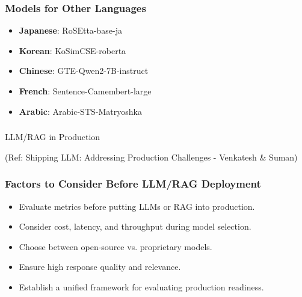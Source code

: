 \begin{frame}[fragile]\frametitle{Models for Other Languages}
    \begin{itemize}
        \item \textbf{Japanese}: RoSEtta-base-ja
        \item \textbf{Korean}: KoSimCSE-roberta
        \item \textbf{Chinese}: GTE-Qwen2-7B-instruct
        \item \textbf{French}: Sentence-Camembert-large
        \item \textbf{Arabic}: Arabic-STS-Matryoshka
    \end{itemize}
\end{frame}

\begin{frame}[fragile]\frametitle{}
\begin{center}
{\Large LLM/RAG in Production}

{\tiny (Ref:  Shipping LLM: Addressing Production Challenges - Venkatesh \& Suman)}
\end{center}
\end{frame}

\begin{frame}[fragile]\frametitle{Factors to Consider Before LLM/RAG Deployment}
  \begin{itemize}
    \item Evaluate metrics before putting LLMs or RAG into production.
    \item Consider cost, latency, and throughput during model selection.
    \item Choose between open-source vs. proprietary models.
    \item Ensure high response quality and relevance.
    \item Establish a unified framework for evaluating production readiness.
  \end{itemize}
\end{frame}

